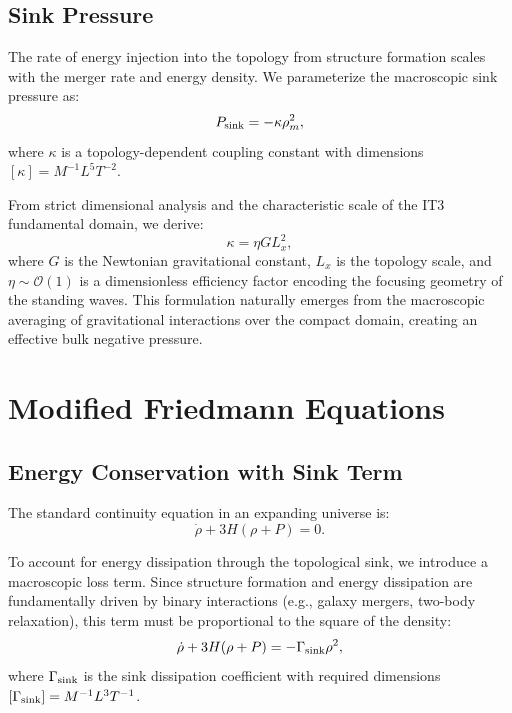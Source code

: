 \documentclass[12pt,a4paper]{article}
\begin{document}
\subsection{Sink Pressure}

The rate of energy injection into the topology from structure formation scales with the merger rate and energy density. We parameterize the macroscopic sink pressure as:
\begin{equation}
P_{\rm sink} = -\kappa \rho_m^2,
\end{equation}
where $\kappa$ is a topology-dependent coupling constant with dimensions $[\kappa] = M^{-1} L^5 T^{-2}$.

From strict dimensional analysis and the characteristic scale of the IT3 fundamental domain, we derive:
\begin{equation}
\kappa = \eta G L_x^2,
\end{equation}
where $G$ is the Newtonian gravitational constant, $L_x$ is the topology scale, and $\eta \sim \mathcal{O}(1)$ is a dimensionless efficiency factor encoding the focusing geometry of the standing waves. This formulation naturally emerges from the macroscopic averaging of gravitational interactions over the compact domain, creating an effective bulk negative pressure.

\section{Modified Friedmann Equations}

\subsection{Energy Conservation with Sink Term}

The standard continuity equation in an expanding universe is:
\begin{equation}
\dot{\rho} + 3H(\rho + P) = 0.
\end{equation}

To account for energy dissipation through the topological sink, we introduce a macroscopic loss term. Since structure formation and energy dissipation are fundamentally driven by binary interactions (e.g., galaxy mergers, two-body relaxation), this term must be proportional to the square of the density:
\begin{equation}
\dot{\rho} + 3H(\rho + P) = -\Gamma_{\rm sink} \rho^2,
\label{eq:modified_continuity}
\end{equation}
where $\Gamma_{\rm sink}$ is the sink dissipation coefficient with required dimensions $[\Gamma_{\rm sink}] = M^{-1} L^3 T^{-1}$.
\end{document}
